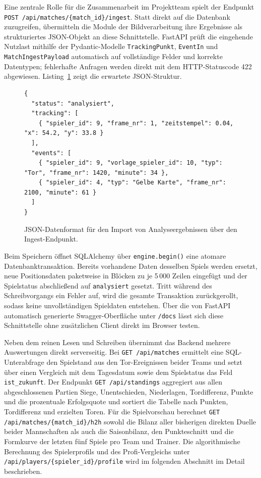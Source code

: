 Eine zentrale Rolle für die Zusammenarbeit im Projektteam spielt der Endpunkt
\texttt{POST /api/matches/\{match\_id\}/ingest}. Statt direkt auf die Datenbank
zuzugreifen, übermitteln die Module der Bildverarbeitung ihre Ergebnisse als
strukturiertes JSON-Objekt an diese Schnittstelle. FastAPI prüft die eingehende
Nutzlast mithilfe der Pydantic-Modelle \texttt{TrackingPunkt}, \texttt{EventIn}
und \texttt{MatchIngestPayload} automatisch auf vollständige Felder und korrekte
Datentypen; fehlerhafte Anfragen werden direkt mit dem HTTP-Statuscode 422
abgewiesen. Listing~\ref{lst:ingest-json} zeigt die erwartete JSON-Struktur.

\begin{figure}[htbp]
    \centering
    \begin{minipage}{0.92\textwidth}
\begin{verbatim}
{
  "status": "analysiert",
  "tracking": [
    { "spieler_id": 9, "frame_nr": 1, "zeitstempel": 0.04, "x": 54.2, "y": 33.8 }
  ],
  "events": [
    { "spieler_id": 9, "vorlage_spieler_id": 10, "typ": "Tor", "frame_nr": 1420, "minute": 34 },
    { "spieler_id": 4, "typ": "Gelbe Karte", "frame_nr": 2100, "minute": 61 }
  ]
}
\end{verbatim}
    \end{minipage}
    \caption{JSON-Datenformat für den Import von Analyseergebnissen über den Ingest-Endpunkt.}
    \label{lst:ingest-json}
\end{figure}

Beim Speichern öffnet SQLAlchemy über \texttt{engine.begin()} eine atomare
Datenbanktransaktion. Bereits vorhandene Daten desselben Spiels werden ersetzt,
neue Positionsdaten paketweise in Blöcken zu je 5\,000 Zeilen eingefügt und der
Spielstatus abschließend auf \texttt{analysiert} gesetzt. Tritt während des
Schreibvorgangs ein Fehler auf, wird die gesamte Transaktion zurückgerollt,
sodass keine unvollständigen Spieldaten entstehen. Über die von FastAPI
automatisch generierte Swagger-Oberfläche unter \texttt{/docs} lässt sich diese
Schnittstelle ohne zusätzlichen Client direkt im Browser testen.

Neben dem reinen Lesen und Schreiben übernimmt das Backend mehrere
Auswertungen direkt serverseitig. Bei \texttt{GET /api/matches} ermittelt eine
SQL-Unterabfrage den Spielstand aus den Tor-Ereignissen beider Teams und setzt
über einen Vergleich mit dem Tagesdatum sowie dem Spielstatus das Feld
\texttt{ist\_zukunft}. Der Endpunkt \texttt{GET /api/standings} aggregiert aus
allen abgeschlossenen Partien Siege, Unentschieden, Niederlagen, Tordifferenz,
Punkte und die prozentuale Erfolgsquote und sortiert die Tabelle nach Punkten,
Tordifferenz und erzielten Toren. Für die Spielvorschau berechnet
\texttt{GET /api/matches/\{match\_id\}/h2h} sowohl die Bilanz aller bisherigen
direkten Duelle beider Mannschaften als auch die Saisonbilanz, den Punkteschnitt
und die Formkurve der letzten fünf Spiele pro Team und Trainer. Die algorithmische
Berechnung des Spielerprofils und des Profi-Vergleichs unter
\texttt{/api/players/\{spieler\_id\}/profile} wird im folgenden Abschnitt im
Detail beschrieben.

